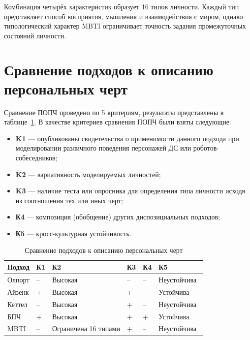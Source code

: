 Комбинация четырёх характеристик образует 16 типов личности.
Каждый тип представляет способ восприятия, мышления и взаимодействия с миром, однако типологический характер MBTI ограничивает точность задания промежуточных состояний личности.

\section{Сравнение подходов к описанию персональных черт}

Сравнение ПОПЧ проведено по 5 критериям, результаты представлены в таблице~\ref{tbl:exist_sol_transposed}.
В качестве критериев сравнения ПОПЧ были взяты следующие:

\begin{itemize}
	\item \textbf{K1} --- опубликованы свидетельства о применимости данного подхода при моделировании различного поведения персонажей ДС или роботов-собеседников;
	\item \textbf{K2} --- вариативность моделируемых личностей;
	\item \textbf{K3} --- наличие теста или опросника для определения типа личности исходя из соотношения тех или иных черт;
	\item \textbf{К4} --- композиция (обобщение) других диспозициальных подходов;
	\item \textbf{К5} --- кросс-культурная устойчивость.
\end{itemize}

\begin{table}[h]
	\centering
	\begin{threeparttable}
		\caption{Сравнение подходов к описанию персональных черт}
		\label{tbl:exist_sol_transposed}
		\begin{tabularx}{\textwidth}{|X|X|p{3cm}|X|X|p{4cm}|}
			\hline
			\textbf{Подход} & \textbf{К1} & \textbf{К2} & \textbf{К3} & \textbf{К4} & \textbf{К5} \\
			\hline
			Олпорт & -- & Высокая & -- & -- & Неустойчива~\cite{kelland2025allport} \\
			\hline
			Айзенк & + & Высокая & + & -- & Устойчива~\cite{barrett1998epq, berry2002traits} \\
			\hline
			Кеттел & -- & Высокая & + & -- & Неустойчива~\cite{abrahams1996crosscultural} \\
			\hline
			БПЧ & + & Высокая & + & + & Устойчива~\cite{ahmad2021framework, berry2002traits} \\
			\hline
			MBTI & -- & Ограничена 16 типами & + & -- & Неустойчива~\cite{yoo_robinson_mbti_multicultural} \\
			\hline
		\end{tabularx}
	\end{threeparttable}
\end{table}

